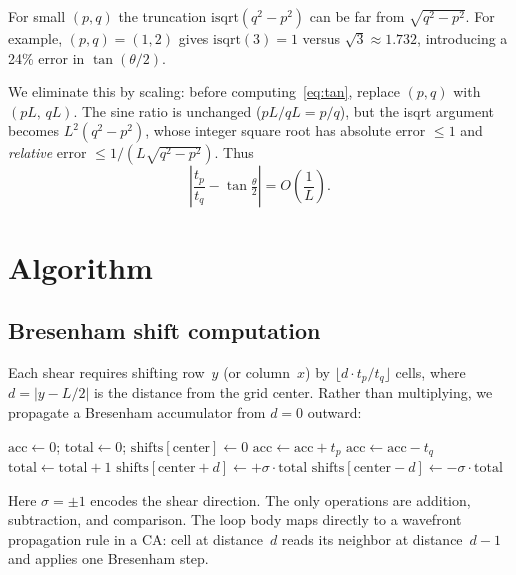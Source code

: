 \documentclass[12pt,a4paper]{article}
\begin{document}
For small $(p,q)$ the truncation $\mathrm{isqrt}(q^2-p^2)$ can be
far from $\sqrt{q^2-p^2}$.  For example, $(p,q)=(1,2)$ gives
$\mathrm{isqrt}(3)=1$ versus $\sqrt{3}\approx1.732$, introducing a
24\% error in $\tan(\theta/2)$.

We eliminate this by scaling: before computing~\eqref{eq:tan}, replace
$(p,q)$ with $(pL,\,qL)$.  The sine ratio is unchanged
($pL/qL = p/q$), but the isqrt argument becomes $L^2(q^2-p^2)$,
whose integer square root has absolute error $\le 1$ and
\emph{relative} error $\le 1/(L\sqrt{q^2-p^2})$.  Thus
\begin{equation}
\label{eq:tanerr}
\left|\frac{t_p}{t_q} - \tan\!\tfrac{\theta}{2}\right|
= O\!\left(\frac{1}{L}\right).
\end{equation}

\section{Algorithm}
\label{sec:algo}

\subsection{Bresenham shift computation}

Each shear requires shifting row~$y$ (or column~$x$) by
$\lfloor d\cdot t_p/t_q \rfloor$ cells, where $d=|y - L/2|$ is the
distance from the grid center.  Rather than multiplying, we propagate
a Bresenham accumulator from $d=0$ outward:

\begin{algorithm}[H]
\caption{Compute cumulative shifts via Bresenham}
\label{alg:bres}
\begin{algorithmic}[1]
\State $\mathrm{acc} \gets 0$; \; $\mathrm{total} \gets 0$;
  \; $\mathrm{shifts}[\mathrm{center}] \gets 0$
  \State $\mathrm{acc} \gets \mathrm{acc} + t_p$
    \State $\mathrm{acc} \gets \mathrm{acc} - t_q$
    \State $\mathrm{total} \gets \mathrm{total} + 1$
  \EndWhile
  \State $\mathrm{shifts}[\mathrm{center}+d] \gets
         +\sigma\cdot\mathrm{total}$
  \State $\mathrm{shifts}[\mathrm{center}-d] \gets
         -\sigma\cdot\mathrm{total}$
\EndFor
\end{algorithmic}
\end{algorithm}

\noindent
Here $\sigma = \pm1$ encodes the shear direction.  The only
operations are addition, subtraction, and comparison.  The loop body
maps directly to a wavefront propagation rule in a CA: cell at
distance~$d$ reads its neighbor at distance~$d-1$ and applies one
Bresenham step.
\end{document}

